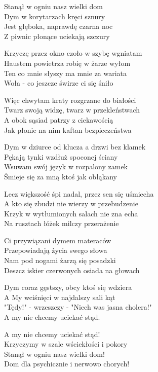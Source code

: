 \begin{text}
    Stanął w ogniu nasz wielki dom\\
    Dym w korytarzach kręci sznury\\
    Jest głęboka, naprawdę czarna noc\\
    Z piwnic płonące uciekają szczury

    Krzyczę przez okno czoło w szybę wgniatam\\
    Haustem powietrza robię w żarze wyłom\\
    Ten co mnie słyszy ma mnie za wariata\\
    Woła - co jeszcze świrze ci się śniło

    Więc chwytam kraty rozgrzane do białości\\
    Twarz swoją widzę, twarz w przekleństwach\\
    A obok sąsiad patrzy z ciekawością\\
    Jak płonie na nim kaftan bezpieczeństwa

    Dym w dziurce od klucza a drzwi bez klamek\\
    Pękają tynki wzdłuż spoconej ściany\\
    Wsuwam swój język w rozpalony zamek\\
    Śmieje się za mną ktoś jak obłąkany

    Lecz większość śpi nadal, przez sen się uśmiecha\\
    A kto się zbudzi nie wierzy w przebudzenie\\
    Krzyk w wytłumionych salach nie zna echa\\
    Na rusztach łóżek milczy przerażenie

    Ci przywiązani dymem materaców\\
    Przepowiadają życia swego słowa\\
    Nam pod nogami żarzą się posadzki\\
    Deszcz iskier czerwonych osiada na głowach

    Dym coraz gęstszy, obcy ktoś się wdziera\\
    A My wciśnięci w najdalszy sali kąt\\
    "Tędy!" - wrzeszczy - "Niech was jasna cholera!"\\
    A my nie chcemy uciekać stąd.

    A my nie chcemy uciekać stąd!\\
    Krzyczymy w szale wściekłości i pokory\\
    Stanął w ogniu nasz wielki dom!\\
    Dom dla psychicznie i nerwowo chorych!



\end{text}
